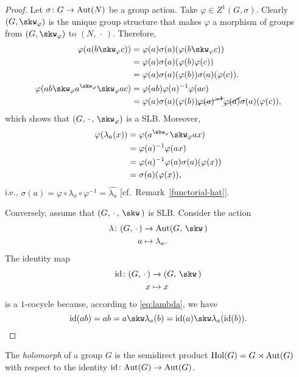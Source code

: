 \begin{proof}
    Let $\sigma\colon G\to{\rm Aut}(N)$ be a group action. Take $\varphi\in Z^1(G,\sigma)$. Clearly $(G,\skw_\varphi)$ is the unique group structure that makes $\varphi$ a morphism of groups from $(G,\skw_\varphi)$ to $(N,\,\cdot\,)$. Therefore,
    \begin{align*}
        \varphi(a(b\skw_\varphi c))
            &= \varphi(a)\sigma(a)(\varphi(b\skw_\varphi c))\\
            &= \varphi(a)\sigma(a)(\varphi(b)\varphi(c))\\
            &= \varphi(a)\sigma(a)(\varphi(b))\sigma(a)(\varphi(c)).\\
        \varphi(ab\skw_\varphi a^{\skw_\varphi}\skw_\varphi ac)
            &= \varphi(ab)\varphi(a)^{-1}\varphi(ac)\\
            &= \varphi(a)\sigma(a)(\varphi(b))
                \cancel{\varphi(a)^{-1}}
                \cancel{\varphi(a)}\sigma(a)(\varphi(c)),
    \end{align*}
    which shows that $(G,\,\cdot\,,\,\skw_\varphi)$ is a SLB. Moreover,
    \begin{align*}
        \varphi(\lambda_a(x)) &= \varphi(a^{\skw_\varphi}\skw_\varphi ax)\\
            &= \varphi(a)^{-1}\varphi(ax)\\
            &= \varphi(a)^{-1}\varphi(a)\sigma(a)(\varphi(x))\\
            &= \sigma(a)(\varphi(x)),
    \end{align*}
    i.e., $\sigma(a) = \varphi\circ\lambda_a\circ\varphi^{-1}=\widehat{\lambda_a}$ [cf.~Remark~\ref{functorial-hat}].

    Conversely, assume that $(G,\,\cdot\,,\,\skw\,)$ is SLB. Consider the action
    \begin{align*}
        \lambda\colon(G,\,\cdot\,)&\to\Aut(G,\,\skw\,)\\
            a&\mapsto\lambda_a.
    \end{align*}
    The identity map
    \begin{align*}
        \id\colon(G,\,\cdot\,)&\to(G,\,\skw\,)\\
        x &\mapsto x
    \end{align*}
    is a $1$-cocycle because, according to \eqref{eq:lambda}, we have
    $$
        \id(ab) = ab = a\skw\lambda_a(b) = \id(a)\skw\lambda_a(\id(b)).
    $$
\end{proof}

\begin{defn}
    The \textsl{holomorph} of a group $G$ is the semidirect product $\operatorname{Hol}(G)=G\rtimes{\rm Aut}(G)$ with respect to the identity $\operatorname{id}\colon {\rm Aut}(G)\to{\rm Aut}(G)$.
\end{defn}

